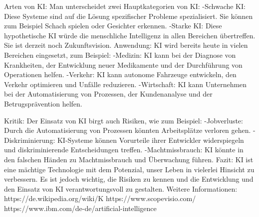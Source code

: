 Arten von KI:
Man unterscheidet zwei Hauptkategorien von KI:
-Schwache KI: Diese Systeme sind auf die Lösung spezifischer Probleme spezialisiert. Sie können zum Beispiel Schach spielen oder Gesichter erkennen.
-Starke KI: Diese hypothetische KI würde die menschliche Intelligenz in allen Bereichen übertreffen. Sie ist derzeit noch Zukunftsvision.
Anwendung:
KI wird bereits heute in vielen Bereichen eingesetzt, zum Beispiel:
-Medizin: KI kann bei der Diagnose von Krankheiten, der Entwicklung neuer Medikamente und der Durchführung von Operationen helfen.
-Verkehr: KI kann autonome Fahrzeuge entwickeln, den Verkehr optimieren und Unfälle reduzieren.
-Wirtschaft: KI kann Unternehmen bei der Automatisierung von Prozessen, der Kundenanalyse und der Betrugsprävention helfen.


Kritik:
Der Einsatz von KI birgt auch Risiken, wie zum Beispiel:
-Jobverluste: Durch die Automatisierung von Prozessen könnten Arbeitsplätze verloren gehen.
-Diskriminierung: KI-Systeme können Vorurteile ihrer Entwickler widerspiegeln und diskriminierende Entscheidungen treffen.
-Machtmissbrauch: KI könnte in den falschen Händen zu Machtmissbrauch und Überwachung führen.
Fazit:
KI ist eine mächtige Technologie mit dem Potenzial, unser Leben in vielerlei Hinsicht zu verbessern. Es ist jedoch wichtig, die Risiken zu kennen und die Entwicklung und den Einsatz von KI verantwortungsvoll zu gestalten.
Weitere Informationen:
https://de.wikipedia.org/wiki/K%
https://www.scopevisio.com/
https://www.ibm.com/de-de/artificial-intelligence

